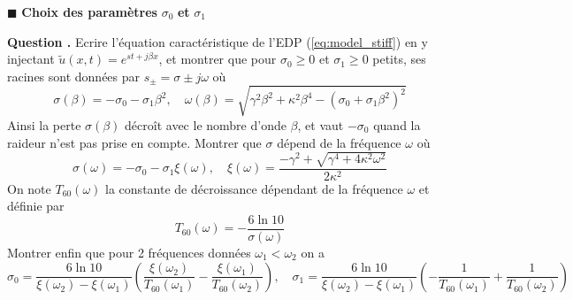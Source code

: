 \documentclass[a4,12pt]{article}
\newcounter{Nbquestion}
\newcommand*\question{%
\stepcounter{Nbquestion}%
\textbf{Question \theNbquestion. }}
\begin{document}
\hspace{0.5cm} $\blacksquare$ \textbf{Choix des paramètres} $\sigma_0$  \textbf{et}  $\sigma_1$\\


\begin{mdframed}[style=exampledefault]
\question Ecrire l'équation caractéristique de l'EDP (\ref{eq:model_stiff}) en y injectant $\tilde u(x,t)=e^{st+j\beta x}$, et montrer que pour $\sigma_0\geqslant 0$ et $\sigma_1\geqslant 0$ petits, ses racines sont données par $s_{\pm}=\sigma\pm j\omega$ où 
\[
\sigma(\beta)=-\sigma_0-\sigma_1\beta^2,\quad \omega(\beta)=\sqrt{\gamma^2 \beta^2+\kappa^2\beta^4-(\sigma_0+\sigma_1\beta^2)^2}
\]
Ainsi la perte $\sigma(\beta)$ décroît avec le nombre d'onde $\beta$, et vaut $-\sigma_0$ quand la raideur n'est pas prise en compte.  Montrer que $\sigma$ dépend de la fréquence $\omega$ où 
\[
\sigma(\omega)=-\sigma_0-\sigma_1\xi (\omega),\quad \xi(\omega)=\frac{-\gamma^2+\sqrt{\gamma^4+4\kappa^2 \omega^2}}{2\kappa^2}
\]
On note $T_{60}(\omega)$ la constante de décroissance dépendant de la fréquence $\omega$ et définie par 
\[
T_{60}(\omega)=-\frac{6\ln 10}{\sigma(\omega)}
\]
Montrer enfin que pour 2 fréquences données $\omega_1<\omega_2$ on a 
\[
\sigma_0=\frac{6 \ln 10}{\xi(\omega_2)-\xi(\omega_1)}\left(\frac{\xi(\omega_2)}{T_{60}(\omega_1)}-\frac{\xi(\omega_1)}{T_{60}(\omega_2)}\right), \quad \sigma_1=\frac{6 \ln 10}{\xi(\omega_2)-\xi(\omega_1)}\left(-\frac{1}{T_{60}(\omega_1)}+\frac{1}{T_{60}(\omega_2)}\right)
\]
\end{mdframed}

\newpage
\end{document}
